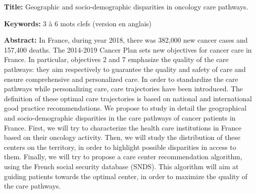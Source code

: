\begin{mdframed}[linecolor=Prune,linewidth=1]

    \textbf{Title:} Geographic and socio-demographic disparities in oncology care pathways.

    \noindent \textbf{Keywords:} 3 à 6 mots clefs (version en anglais)

    \vspace{-.5cm}
    \begin{multicols}{2}
        \noindent \textbf{Abstract:} In France, during year 2018, there was 382,000 new cancer cases and 157,400 deaths. The 2014-2019 Cancer Plan sets new objectives for cancer care in France. In particular, objectives 2 and 7 emphasize the quality of the care pathways: they aim respectively to guarantee the quality and safety of care and ensure comprehensive and personalized care. In order to standardize the care pathways while personalizing care, care trajectories have been introduced. The definition of these optimal care trajectories is based on national and international good practice recommendations. We propose to study in detail the geographical and socio-demographic disparities in the care pathways of cancer patients in France. First, we will try to characterize the health care institutions in France based on their oncology activity. Then, we will study the distribution of these centers on the territory, in order to highlight possible disparities in access to them. Finally, we will try to propose a care center recommendation algorithm, using the French social security database (SNDS). This algorithm will aim at guiding patients towards the optimal center, in order to maximize the quality of the care pathways.

    \end{multicols}
\end{mdframed}
